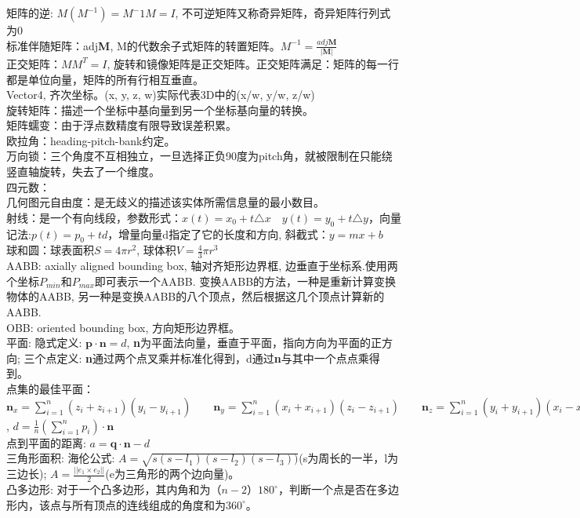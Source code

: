 \documentclass[UTF8]{ctexart}
\begin{document}
矩阵的逆: $M(M^{-1}) = M^-1M = I$, 不可逆矩阵又称奇异矩阵，奇异矩阵行列式为0\\
标准伴随矩阵：adj\textbf{M}, M的代数余子式矩阵的转置矩阵。$M^{-1} = \frac{adj\textbf{M}}{|\textbf{M}|}$\\
正交矩阵：\textbf{$MM^{T} = I$}, 旋转和镜像矩阵是正交矩阵。正交矩阵满足：矩阵的每一行都是单位向量，矩阵的所有行相互垂直。\\
Vector4, 齐次坐标。(x, y, z, w)实际代表3D中的(x/w, y/w, z/w)\\
旋转矩阵：描述一个坐标中基向量到另一个坐标基向量的转换。\\
矩阵蠕变：由于浮点数精度有限导致误差积累。\\
欧拉角：heading-pitch-bank约定。\\
万向锁：三个角度不互相独立，一旦选择正负90度为pitch角，就被限制在只能绕竖直轴旋转，失去了一个维度。\\
四元数：\\
几何图元自由度：是无歧义的描述该实体所需信息量的最小数目。\\
射线：是一个有向线段，参数形式：$x(t)=x_0+t\triangle x \quad y(t)=y_0+t\triangle y$，向量记法:$p(t)=p_0 + td$，增量向量d指定了它的长度和方向, 斜截式：$y=mx+b$\\
球和圆：球表面积$S=4\pi r^2$, 球体积$V=\frac{4}{3}\pi r^3$\\
AABB: axially aligned bounding box, 轴对齐矩形边界框, 边垂直于坐标系.使用两个坐标$P_{min}$和$P_{max}$即可表示一个AABB. 变换AABB的方法，一种是重新计算变换物体的AABB, 另一种是变换AABB的八个顶点，然后根据这几个顶点计算新的AABB.\\
OBB: oriented bounding box, 方向矩形边界框。\\
平面: 隐式定义: $\textbf{p}\cdot \textbf{n}=d$, \textbf{n}为平面法向量，垂直于平面，指向方向为平面的正方向; 三个点定义: \textbf{n}通过两个点叉乘并标准化得到，d通过\textbf{n}与其中一个点点乘得到。\\
点集的最佳平面：$\textbf{n}_x=\sum_{i=1}^{n}(z_{i}+z_{i+1})(y_{i}-y_{i+1})\qquad \textbf{n}_y=\sum_{i=1}^{n}(x_{i}+x_{i+1})(z_{i}-z_{i+1})\qquad \textbf{n}_z=\sum_{i=1}^{n}(y_{i}+y_{i+1})(x_{i}-x_{i+1})$, $d=\frac{1}{n}(\sum_{i=1}^{n}p_{i})\cdot \textbf{n}$\\
点到平面的距离: $a=\textbf{q}\cdot \textbf{n}-d$\\
三角形面积: 海伦公式: $A=\sqrt{s(s-l_1)(s-l_2)(s-l_3))}$(s为周长的一半，l为三边长); $A=\frac{||e_1\times e_2||}{2}$(e为三角形的两个边向量)。\\
凸多边形: 对于一个凸多边形，其内角和为$（n-2）180^{\circ}$，判断一个点是否在多边形内，该点与所有顶点的连线组成的角度和为$360^{\circ}$。\\
\end{document}
